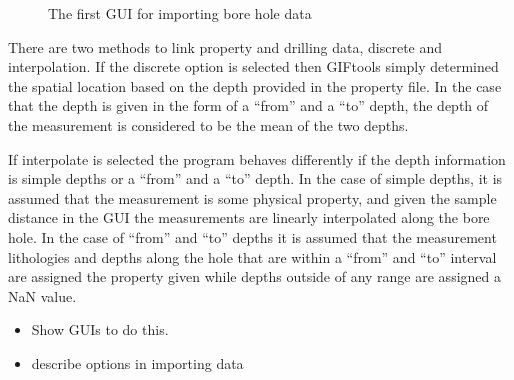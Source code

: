  \begin{figure} [h]
    \centering
    \caption{The first \ac{GUI} for importing bore hole data}
    \label{fig:BHimport1}
\end{figure}

There are two methods to link property and drilling data,  discrete and interpolation. If the discrete option is selected then GIFtools simply determined the spatial location based on the depth provided in the property file. In the case that the depth is given in the form of a ``from'' and a ``to'' depth, the depth of the measurement is considered to be the mean of the two depths. 

If interpolate is selected the program behaves differently if the depth information is simple depths or a ``from'' and a ``to'' depth. In the case of simple depths, it is assumed that the measurement is some physical property, and given the sample distance in the \ac{GUI} the measurements are linearly interpolated along the bore hole. In the case of ``from'' and ``to'' depths it is assumed that the measurement lithologies and depths along the hole that are within a ``from'' and ``to'' interval are assigned the property given while depths outside of any range are assigned a NaN value.






\begin{itemize}
 \item Show \ac{GUI}s to do this.
 \item describe options in importing data
\end{itemize}




